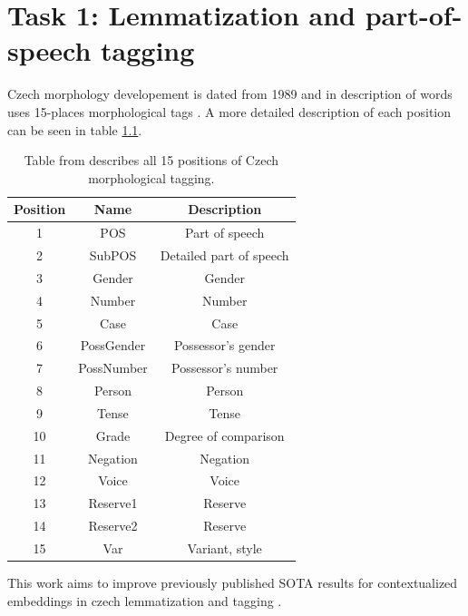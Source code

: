 \chapter{Task 1: Lemmatization and part-of-speech tagging}
\label{chap:tag}
Czech morphology developement is dated from 1989 %
and in description of words uses 15-places morphological tags \citep{Hana2005}.
A more detailed description of each position can be seen in table \ref{Tab:tagset}.

\begin{table}
\centering
\label{Tab:tagset}
\begin{tabular}{ |c|c|c| } 


 \hline
 Position & Name & Description \\ 
 \hline \hline
 1 & POS & Part of speech \\ \hline
 2 & SubPOS & Detailed part of speech \\ \hline
  3 & Gender & Gender \\ \hline
4 & Number & Number \\\hline
  5 & Case & Case \\ \hline
 6 & PossGender & Possessor's gender \\\hline
  7 & PossNumber & Possessor's number \\ \hline
8 & Person & Person \\\hline
  9 & Tense & Tense \\ \hline
 10 & Grade & Degree of comparison\\\hline
  11 & Negation & Negation \\ \hline
 12 & Voice & Voice \\\hline
 13 & Reserve1 & Reserve \\ \hline
14 & Reserve2 & Reserve \\\hline
  15 & Var & Variant, style \\ 
 \hline

\end{tabular}
\caption{Table from \citep{Hana2005} describes all 15 positions of Czech morphological tagging.
} 
\end{table}
This work aims to improve previously published SOTA results for contextualized embeddings in czech lemmatization and tagging \citep{Straka2019}. 

